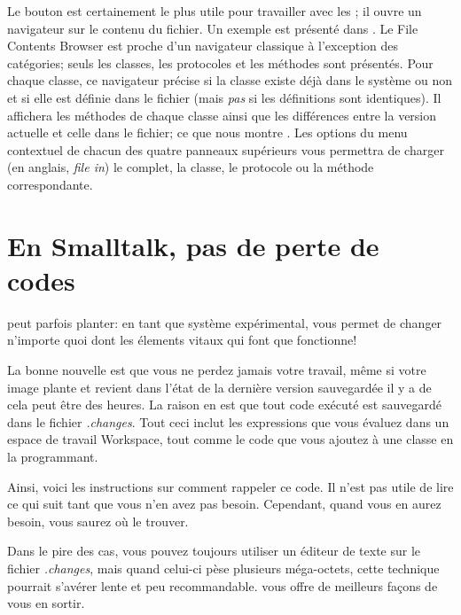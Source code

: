 \documentclass[a4paper,10pt,twoside]{book}
\begin{document}
Le bouton  est certainement le plus utile pour travailler avec les \changesets;
il ouvre un navigateur sur le contenu du fichier. Un exemple est pr\'esent\'e dans
.
Le File Contents Browser est proche d'un navigateur classique \`a l'exception
des cat\'egories; seuls les classes, les protocoles et les m\'ethodes sont pr\'esent\'es.
Pour chaque classe, ce navigateur pr\'ecise si la classe existe d\'ej\`a dans
le syst\`eme ou non et si elle est d\'efinie dans le fichier (mais \emph{pas} si
les d\'efinitions sont identiques).
Il affichera les m\'ethodes de chaque classe
ainsi que les diff\'erences entre la version actuelle et celle dans le fichier; ce que
nous montre .
Les options du menu contextuel de chacun des quatre panneaux sup\'erieurs vous
permettra de charger (en anglais, \emph{file in}) le \changeset complet, la classe, 
le protocole ou la m\'ethode correspondante.

\section{En Smalltalk, pas de perte de codes}
\label{sec:cantLoseCode} %

\sq peut parfois planter: en tant que syst\`eme exp\'erimental, \sq vous permet
de changer n'importe quoi dont les \'elements vitaux qui font que \sq fonctionne!


La bonne nouvelle est que vous ne perdez jamais votre travail, m\^eme si votre 
image plante et revient dans l'\'etat de la derni\`ere version sauvegard\'ee il y 
a de cela peut \^etre des heures.
La raison en est que tout code ex\'ecut\'e est sauvegard\'e dans le fichier
\emph{.changes}.
Tout ceci inclut les expressions que vous \'evaluez dans un espace de travail Workspace,
tout comme le code que vous ajoutez \`a une classe en la programmant.

Ainsi, voici les instructions sur comment rappeler ce code.
Il n'est pas utile de lire ce qui suit tant que vous n'en avez pas besoin.
Cependant, quand vous en aurez besoin, vous saurez o\`u le trouver.

Dans le pire des cas, vous pouvez toujours utiliser un \'editeur de texte
sur le fichier \emph{.changes}, mais quand celui-ci p\`ese plusieurs m\'ega-octets,
cette technique pourrait s'av\'erer lente et peu recommandable.
\sq vous offre de meilleurs fa\c{c}ons 
de vous en sortir.
\end{document}
